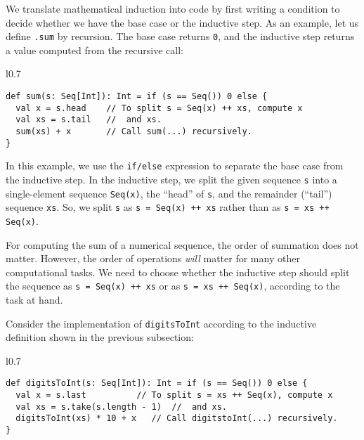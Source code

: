 We translate mathematical induction into code by first writing a condition
to decide whether we have the base case or the inductive step. As
an example, let us define \lstinline!.sum! by recursion. The base
case returns \lstinline!0!, and the inductive step returns a value
computed from the recursive call:

\begin{wrapfigure}{l}{0.7\columnwidth}%
\vspace{-0.85\baselineskip}
\begin{lstlisting}
def sum(s: Seq[Int]): Int = if (s == Seq()) 0 else {
  val x = s.head    // To split s = Seq(x) ++ xs, compute x
  val xs = s.tail   //  and xs.
  sum(xs) + x       // Call sum(...) recursively.
}
\end{lstlisting}

\vspace{-1.5\baselineskip}
\end{wrapfigure}%

\noindent In this example, we use the \lstinline!if/else! expression
to separate the base case from the inductive step. In the inductive
step, we split the given sequence \lstinline!s! into a single-element
sequence \lstinline!Seq(x)!, the ``head'' of \lstinline!s!, and
the remainder (``tail'') sequence \lstinline!xs!. So, we split
\lstinline!s! as \lstinline!s = Seq(x) ++ xs! rather than as \lstinline!s = xs ++ Seq(x)!. 

For computing the sum of a numerical sequence, the order of summation
does not matter. However, the order of operations \emph{will} matter
for many other computational tasks. We need to choose whether the
inductive step should split the sequence as \lstinline!s = Seq(x) ++ xs!
or as \lstinline!s = xs ++ Seq(x)!, according to the task at hand.

Consider the implementation of \lstinline!digitsToInt! according
to the inductive definition shown in the previous subsection:

\begin{wrapfigure}{l}{0.7\columnwidth}%
\vspace{-0.85\baselineskip}
\begin{lstlisting}
def digitsToInt(s: Seq[Int]): Int = if (s == Seq()) 0 else {
  val x = s.last          // To split s = xs ++ Seq(x), compute x
  val xs = s.take(s.length - 1)  //  and xs.
  digitsToInt(xs) * 10 + x   // Call digitstoInt(...) recursively.
}
\end{lstlisting}

\vspace{-1.5\baselineskip}
\end{wrapfigure}%

